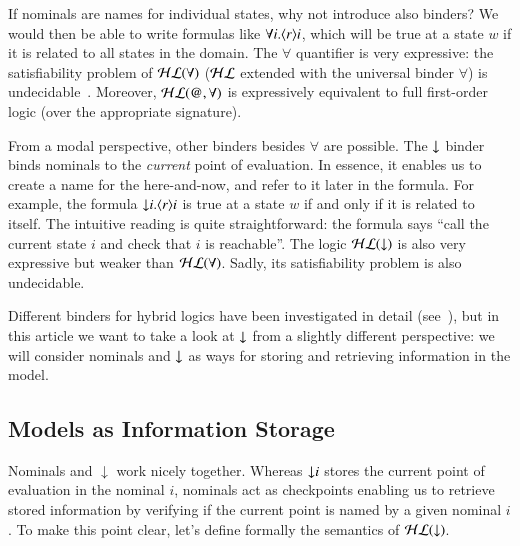 If nominals are names for individual states, why not introduce also
binders?  We would then be able to write formulas like $\forall
i.\langle r \rangle i$, which will be true at a state $w$ if it is related to
all states in the domain.  The $\forall$ quantifier is very
expressive: the satisfiability problem of $\mathcal{HL}(\forall)$  ($\mathcal{HL}$
extended with the universal binder $\forall$) is
undecidable~\cite{BS95}. Moreover, $\mathcal{HL}(@,\forall)$ is expressively
equivalent to full first-order logic (over the appropriate
signature).

From a modal perspective, other binders besides $\forall$ are
possible.  The ${\downarrow}$ binder binds nominals to the \emph{current}
point of evaluation. In essence, it enables us to create a name for
the here-and-now, and refer to it later in the formula.  For
example, the formula ${\downarrow} i.\langle r \rangle i$ is true at a state $w$ if
and only if it is related to itself.  The intuitive reading is quite
straightforward: the formula says ``call the current state $i$ and
check that $i$ is reachable''.  The logic $\mathcal{HL}({\downarrow})$ is also very
expressive but weaker than $\mathcal{HL}(\forall)$.  Sadly, its
satisfiability problem is also undecidable.

Different binders for hybrid logics have been investigated in detail
(see~\cite{BS95}), but in this article we want to take a look at
${\downarrow}$ from a slightly different perspective: we will consider
nominals and ${\downarrow}$ as ways for storing and retrieving information
in the model.



\subsection{Models as Information Storage}

Nominals and $\downarrow$ work nicely together.
Whereas ${\downarrow} i$ stores the current point of evaluation in the
nominal $i$, nominals act as checkpoints enabling us to retrieve
stored information by verifying if the current point is named by a
given nominal $i$.  To make this point clear, let's define formally
the semantics of $\mathcal{HL}({\downarrow})$.

